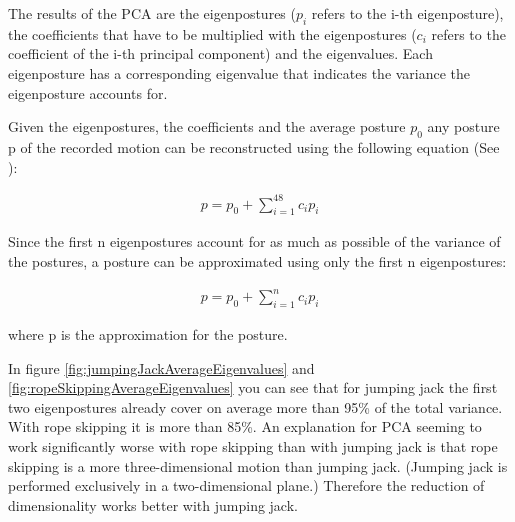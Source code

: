 \documentclass[a4paper]{article}
\begin{document}
The results of the PCA are the eigenpostures ($p_{i}$ refers to the i-th eigenposture), the coefficients that have to be multiplied with the eigenpostures ($c_{i}$ refers to the coefficient of the i-th principal component) and the eigenvalues. Each eigenposture has a corresponding eigenvalue that indicates the variance the eigenposture accounts for.

Given the eigenpostures, the coefficients and the average posture $p_{0}$ any posture p of the recorded motion can be reconstructed using the following equation (See \cite{origin}):

\begin{align}
	p = p_{0} + \sum^{48}_{i = 1} c_{i} p_{i} \label{eq:reconstructPosture}
\end{align}

Since the first n eigenpostures account for as much as possible of the variance of the postures, a posture can be approximated using only the first n eigenpostures:

\begin{align}
	p = p_{0} + \sum^{n}_{i = 1} c_{i} p_{i} \label{eq:approxPosture}
\end{align}

where p is the approximation for the posture.

In figure \ref{fig:jumpingJackAverageEigenvalues} and \ref{fig:ropeSkippingAverageEigenvalues} you can see that for jumping jack the first two eigenpostures already cover on average more than 95\% of the total variance. With rope skipping it is more than 85\%. An explanation for PCA seeming to work significantly worse with rope skipping than with jumping jack is that rope skipping is a more three-dimensional motion than jumping jack. (Jumping jack is performed exclusively in a two-dimensional plane.) Therefore the reduction of dimensionality works better with jumping jack.
\end{document}

